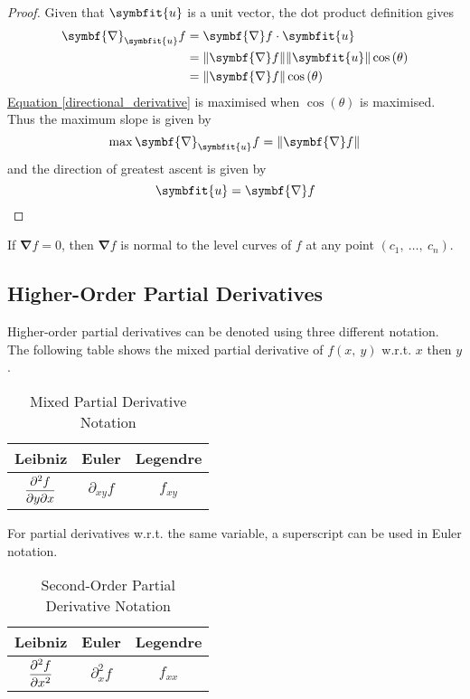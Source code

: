 \documentclass{article}
\begin{document}
\begin{proof}
    Given that $\symbfit{u}$ is a unit vector, the dot product definition
    gives
    \begin{align}
        \symbf{\nabla}_{\symbfit{u}}f &= \symbf{\nabla}f \cdot \symbfit{u} \nonumber \\
        &= \norm{\symbf{\nabla}f} \norm{\symbfit{u}} \cos{\left( \theta \right)} \nonumber \\
        &= \norm{\symbf{\nabla}f} \cos{\left( \theta \right)} \label{directional_derivative}
    \end{align}
    \hyperref[directional_derivative]{Equation \ref{directional_derivative}} is
    maximised when $\cos{\left( \theta \right)}$ is maximised. Thus the
    maximum slope is given by
    \begin{equation*}
        \max \symbf{\nabla}_{\symbfit{u}}f = \norm{\symbf{\nabla}f}
    \end{equation*}
    and the direction of greatest ascent is given by
    \begin{equation*}
        \symbfit{u} = \symbf{\nabla}f
    \end{equation*}
\end{proof}
\begin{theorem}
    If $\symbf{\nabla}f = 0$, then $\symbf{\nabla}f$ is normal to the level
    curves of $f$ at any point $(c_1,\: \ldots,\: c_n)$.
\end{theorem}
\subsection{Higher-Order Partial Derivatives}
\begin{definition}
    Higher-order partial derivatives can be denoted using three different
    notation. The following table shows the mixed partial derivative of
    $f(x,\: y)$ w.r.t. $x$ then $y$.
    \begin{table}[H]
        \centering
        \begin{tabular}{c c c}
            \toprule
            \textbf{Leibniz} & \textbf{Euler} & \textbf{Legendre} \\
            \midrule
            $\displaystyle\pdv{f}{y}{x}$ & $\partial_{x y}{f}$ & $f_{x y}$ \\
            \bottomrule
        \end{tabular}
        \caption{Mixed Partial Derivative Notation}
    \end{table}
    For partial derivatives w.r.t. the same variable, a superscript can be used
    in Euler notation.
    \begin{table}[H]
        \centering
        \begin{tabular}{c c c}
            \toprule
            \textbf{Leibniz} & \textbf{Euler} & \textbf{Legendre} \\
            \midrule
            $\displaystyle\pdv[2]{f}{x}$ & $\partial^2_{x}{f}$ & $f_{x x}$ \\
            \bottomrule
        \end{tabular}
        \caption{Second-Order Partial Derivative Notation}
    \end{table}
\end{definition}
\end{document}
